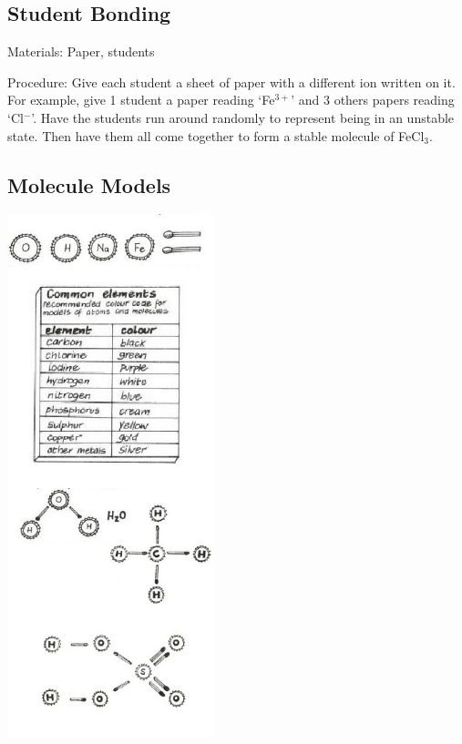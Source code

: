 \begin{multicols}{2}
\subsection{Student Bonding}


\begin{description*}
\item[Materials:]{Paper, students}
\item[Procedure:]{Give each student a sheet of paper with a different ion written on it. For example, give 1 student a paper reading `Fe$^{3+}$' and 3 others papers reading `Cl$^-$'. Have the students run around randomly to represent being in an unstable state. Then have them all come together to form a stable molecule of FeCl$_3$.}
\end{description*}

\subsection{Molecule Models}  %

\begin{center}
\includegraphics[width=0.45\textwidth]{./img/vso/molecule-model.jpg}
\end{center}


\end{multicols}
